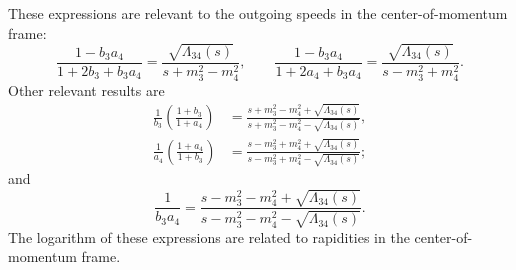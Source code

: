These expressions are relevant to the outgoing speeds in the center-of-momentum frame:
\begin{equation}
	\frac{1 - b_{3} a_{4}}{1 + 2 b_{3} + b_{3} a_{4}} = \frac{\sqrt{\Lambda_{34}(s)}}{s + m_{3}^{2} - m_{4}^{2}}, \qquad \frac{1 - b_{3} a_{4}}{1 + 2 a_{4} + b_{3} a_{4}} = \frac{\sqrt{\Lambda_{34}(s)}}{s - m_{3}^{2} + m_{4}^{2}}.
\end{equation}
Other relevant results are
\begin{align}
	\frac{1}{b_{3}} \left( \frac{1 + b_{3}}{1 + a_{4}} \right) &= \frac{s + m_{3}^{2} - m_{4}^{2} + \sqrt{\Lambda_{34}(s)}}{s + m_{3}^{2} - m_{4}^{2} - \sqrt{\Lambda_{34}(s)}}, \\
	\frac{1}{a_{4}} \left( \frac{1 + a_{4}}{1 + b_{3}} \right) &= \frac{s - m_{3}^{2} + m_{4}^{2} + \sqrt{\Lambda_{34}(s)}}{s - m_{3}^{2} + m_{4}^{2} - \sqrt{\Lambda_{34}(s)}};
\end{align}
and
\begin{equation}
	\frac{1}{b_{3}a_{4}} = \frac{s - m_{3}^{2} - m_{4}^{2} + \sqrt{\Lambda_{34}(s)}}{s - m_{3}^{2} - m_{4}^{2} - \sqrt{\Lambda_{34}(s)}}.
\end{equation}
The logarithm of these expressions are related to rapidities in the center-of-momentum frame.

